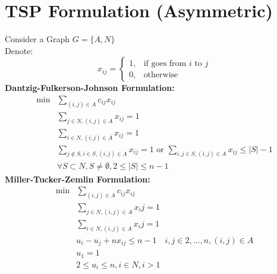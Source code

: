 		\section{TSP Formulation (Asymmetric)}
			Consider a Graph $G=\{A, N\}$\\
			Denote:\\
			\begin{equation}
				x_{ij} = \begin{cases}1, &\text{if goes from } i \text{ to } j\\ 0, & \text{otherwise}\end{cases}
			\end{equation}
			\textbf{Dantzig-Fulkerson-Johnson Formulation:}
			\begin{align}
				\min &\sum_{(i, j)\in A} c_{ij}x_{ij} \\
				& \sum_{j \in N, (i,j)\in A} x_{ij} = 1 \\
				& \sum_{i \in N, (i,j)\in A} x_{ij} = 1 \\
				& \sum_{j\notin S, i\in S, (i,j)\in A} x_{ij} = 1\text{ or } \sum_{i, j \in S, (i, j) \in A} x_{ij} \le |S| - 1 \\
				& \forall S \subset N, S\ne \emptyset, 2\le |S| \le n-1 
			\end{align}
			\textbf{Miller-Tucker-Zemlin Formulation:}
			\begin{align}
				\min &\sum_{(i, j)\in A} c_{ij}x_{ij} \\
				& \sum_{j \in N, (i,j)\in A} x_ij = 1 \\
				& \sum_{i \in N, (i,j)\in A} x_ij = 1 \\
				& u_i - u_j +nx_{ij}\le n-1 \quad i, j\in{2, ... , n}, (i, j)\in A \\
				& u_1 = 1 \\
				& 2 \le u_i \le n, i\in N, i>1 
			\end{align}

